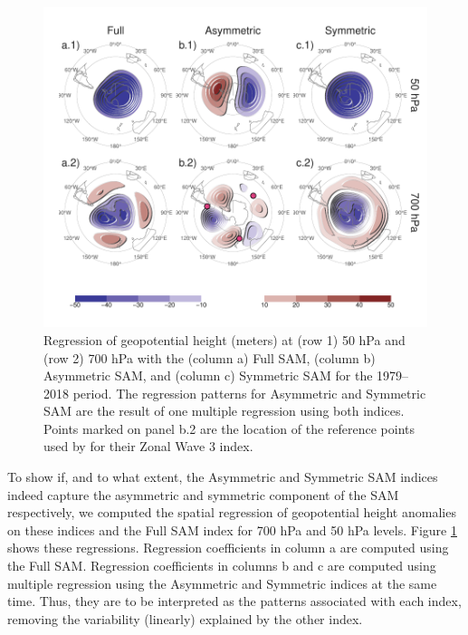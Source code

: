 \documentclass[]{ametsocV5}
\begin{document}
\begin{figure}
\includegraphics{2d-regr-1} \caption[Regression of geopotential height (meters) at (row 1) 50 hPa and (row 2) 700 hPa with the (column a) Full SAM, (column b) Asymmetric SAM, and (column c) Symmetric SAM for the 1979–2018 period]{Regression of geopotential height (meters) at (row 1) 50 hPa and (row 2) 700 hPa with the (column a) Full SAM, (column b) Asymmetric SAM, and (column c) Symmetric SAM for the 1979–2018 period. The regression patterns for Asymmetric and Symmetric SAM are the result of one multiple regression using both indices. Points marked on panel b.2 are the location of the reference points used by \cite{raphael2004} for their Zonal Wave 3 index. }\label{fig:2d-regr}
\end{figure}

To show if, and to what extent, the Asymmetric and Symmetric SAM indices
indeed capture the asymmetric and symmetric component of the SAM
respectively, we computed the spatial regression of geopotential height
anomalies on these indices and the Full SAM index for 700 hPa and 50 hPa
levels. Figure \ref{fig:2d-regr} shows these regressions. Regression
coefficients in column a are computed using the Full SAM. Regression
coefficients in columns b and c are computed using multiple regression
using the Asymmetric and Symmetric indices at the same time. Thus, they
are to be interpreted as the patterns associated with each index,
removing the variability (linearly) explained by the other index.
\end{document}

